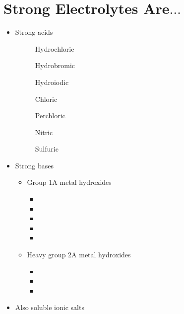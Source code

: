 \documentclass[
	chapter=4
]{chem122notes}
\begin{document}
\section{Strong Electrolytes Are$\dots$}\label{sec:strong-electrolytes-are}
\begin{itemize}
	\item Strong acids
	\begin{description}
		\item[] Hydrochloric
		\item[] Hydrobromic
		\item[] Hydroiodic
		\item[] Chloric
		\item[] Perchloric
		\item[] Nitric
		\item[] Sulfuric
	\end{description}
	\item Strong bases
	\begin{itemize}
		\item Group 1A metal hydroxides
		\begin{itemize}
			\item {}
			\item {}
			\item {}
			\item {}
			\item {}
		\end{itemize}
		\item Heavy group 2A metal hydroxides
		\begin{itemize}
			\item {}
			\item {}
			\item {}
		\end{itemize}
	\end{itemize}
	\item Also soluble ionic salts
\end{itemize}
\end{document}
